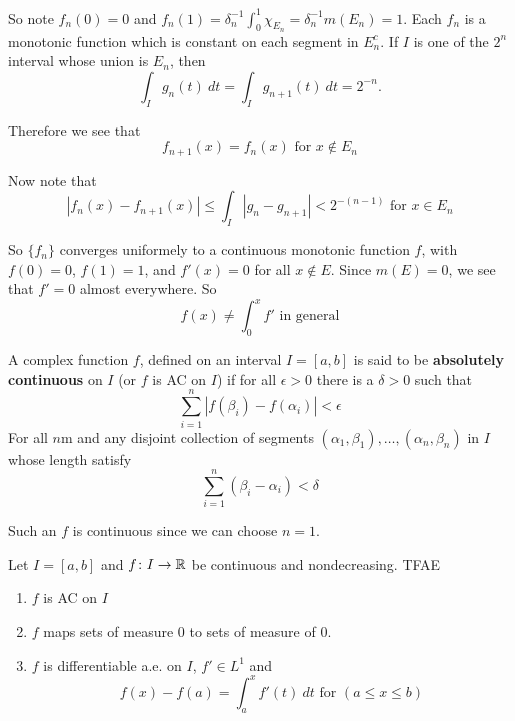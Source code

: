 \begin{enumerate}[label = (\alph*)]
    So note $f_n(0) = 0$ and $f_n(1) = \delta_n^{-1}\int_0^1 \chi_{E_n} = \delta_n^{-1}m(E_n) = 1$. Each $f_n$ is a monotonic function which is constant on each segment in $E_n^c$.
    If $I$ is one of the $2^n$ interval whose union is $E_n$, then\[
        \int_I g_n(t)~dt = \int_I g_{n+1}(t)~dt = 2^{-n}.    
    \]

    Therefore we see that \[
        f_{n+1}(x) = f_n(x)  \text{ for }x\not\in E_n   
    \]

    Now note that \[
        |f_n(x) - f_{n+1}(x)|\leq \int_I |g_n-g_{n+1}|<2^{-(n-1)} \text{ for } x\in E_n    
    \]

    So $\{f_n\}$ converges uniformely to a continuous monotonic function $f$, with $f(0) = 0$, $f(1) = 1$, and $f'(x) = 0$ for all $x\not\in E$. Since $m(E) = 0$, we see that $f' = 0$ almost everywhere. So\[
        f(x) \neq \int_0^x f' \text{ in general}    
    \]

    \begin{definition}
        A complex function $f$, defined on an interval $I = [a,b]$ is said to be \textbf{absolutely continuous} on $I$ (or $f$ is AC on $I$) if for all $\epsilon>0$ there is a $\delta>0$ such that\[
            \sum_{i=1}^n|f(\beta_i)-f(\alpha_i)|<\epsilon    
        \]
        For all $n$m and any disjoint collection of segments $(\alpha_1,\beta_1),\ldots,(\alpha_n,\beta_n)$ in $I$ whose length satisfy\[
            \sum_{i=1}^n (\beta_i-\alpha_i)<\delta    
        \]
        \begin{remark}
            Such an $f$ is continuous since we can choose $n=1$.
        \end{remark}
    \end{definition}

    \begin{theorem}\label{7.18}
        Let $I=[a,b]$ and $f\colon I\rightarrow \mathbb{R}$ be continuous and nondecreasing. TFAE\begin{enumerate}[label=(\alph*)]
            \item $f$ is AC on $I$
            \item $f$ maps sets of measure $0$ to sets of measure of $0$.
            \item $f$ is differentiable a.e. on $I$, $f'\in L^1$ and \[
                f(x) - f(a) = \int_a^x f'(t)~dt \text{ for }(a\leq x\leq b)    
            \]
        \end{enumerate}
    \end{theorem}
\end{enumerate}

















\printindex
